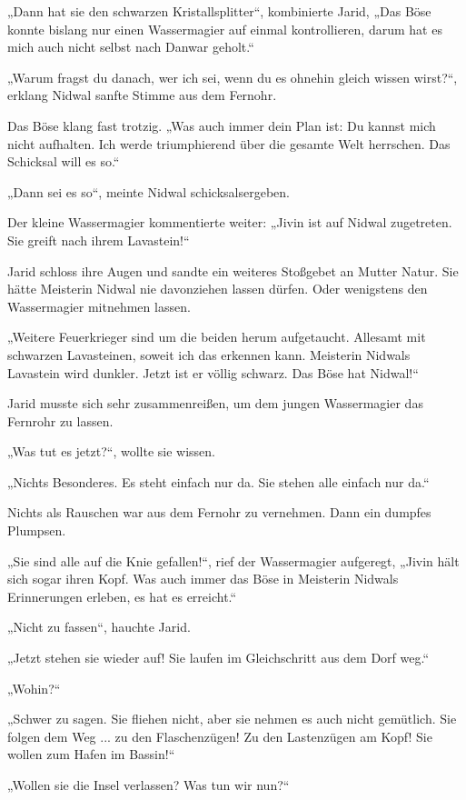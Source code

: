 „Dann hat sie den schwarzen Kristallsplitter“, kombinierte Jarid, „Das Böse konnte bislang nur einen Wassermagier auf einmal kontrollieren, darum hat es mich auch nicht selbst nach Danwar geholt.“

„Warum fragst du danach, wer ich sei, wenn du es ohnehin gleich wissen wirst?“, erklang Nidwal sanfte Stimme aus dem Fernohr.

Das Böse klang fast trotzig. „Was auch immer dein Plan ist: Du kannst mich nicht aufhalten. Ich werde triumphierend über die gesamte Welt herrschen. Das Schicksal will es so.“

„Dann sei es so“, meinte Nidwal schicksalsergeben.

Der kleine Wassermagier kommentierte weiter: „Jivin ist auf Nidwal zugetreten. Sie greift nach ihrem Lavastein!“

Jarid schloss ihre Augen und sandte ein weiteres Stoßgebet an Mutter Natur. Sie hätte Meisterin Nidwal nie davonziehen lassen dürfen. Oder wenigstens den Wassermagier mitnehmen lassen.

„Weitere Feuerkrieger sind um die beiden herum aufgetaucht. Allesamt mit schwarzen Lavasteinen, soweit ich das erkennen kann. Meisterin Nidwals Lavastein wird dunkler. Jetzt ist er völlig schwarz. Das Böse hat Nidwal!“

Jarid musste sich sehr zusammenreißen, um dem jungen Wassermagier das Fernrohr zu lassen.

„Was tut es jetzt?“, wollte sie wissen.

„Nichts Besonderes. Es steht einfach nur da. Sie stehen alle einfach nur da.“

Nichts als Rauschen war aus dem Fernohr zu vernehmen. Dann ein dumpfes Plumpsen.

„Sie sind alle auf die Knie gefallen!“, rief der Wassermagier aufgeregt, „Jivin hält sich sogar ihren Kopf. Was auch immer das Böse in Meisterin Nidwals Erinnerungen erleben, es hat es erreicht.“

„Nicht zu fassen“, hauchte Jarid.

„Jetzt stehen sie wieder auf! Sie laufen im Gleichschritt aus dem Dorf weg.“

„Wohin?“

„Schwer zu sagen. Sie fliehen nicht, aber sie nehmen es auch nicht gemütlich. Sie folgen dem Weg ... zu den Flaschenzügen! Zu den Lastenzügen am Kopf! Sie wollen zum Hafen im Bassin!“

„Wollen sie die Insel verlassen? Was tun wir nun?“

